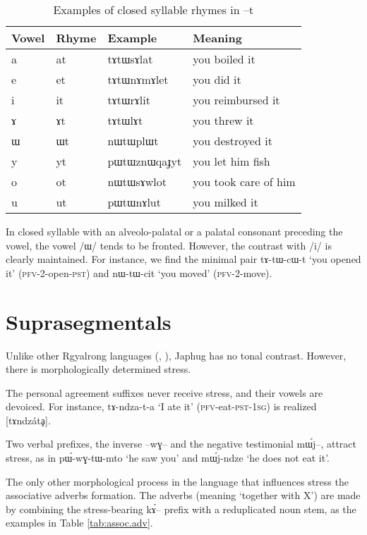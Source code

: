 \documentclass[oldfontcommands,oneside,a4paper,11pt]{article}
\newcommand{\ipa}[1]{{\phon #1}} %
\begin{document}
\begin{table}
 \caption{Examples of closed syllable rhymes in \ipa{--t}} \label{tab:t.rhymes}  \centering
\begin{tabular}{llll}
\toprule
Vowel & Rhyme & Example & Meaning\\
\midrule
\ipa{a} &	   	\ipa{at} &\ipa{tɤtɯsɤlat} &you boiled it\\
\ipa{e} &	  	\ipa{et} &\ipa{tɤtɯnɤmɤlet} & you did it\\
\ipa{i} &	   	\ipa{it} &\ipa{tɤtɯrɤlit} & you reimbursed it\\
\ipa{ɤ} &	   	\ipa{ɤt} &\ipa{tɤtɯlɤt} & you threw it\\
\ipa{ɯ} &	   	\ipa{ɯt} &\ipa{nɯtɯplɯt} & you destroyed it \\
\ipa{y} &	 \ipa{yt} &\ipa{pɯtɯznɯqaɟyt} & you let him fish\\
\ipa{o} & 	\ipa{ot} &\ipa{nɯtɯsɤwlot} & you took care of him\\
\ipa{u} & 	\ipa{ut} & \ipa{pɯtɯnɤlut} & you milked it\\
\bottomrule
\end{tabular}
\end{table}

In closed syllable with an alveolo-palatal or a palatal consonant preceding the vowel, the vowel /\ipa{ɯ}/ tends to be fronted. However, the contrast with /\ipa{i}/ is clearly maintained. For instance, we find the minimal pair \ipa{tɤ-tɯ-cɯ-t} `you opened it' (\textsc{pfv}-2-open-\textsc{pst}) and \ipa{nɯ-tɯ-cit} `you moved' (\textsc{pfv}-2-move).
    
     \section{Suprasegmentals}
Unlike other Rgyalrong languages (\citealt{jackson05yingao}, \citealt{linyj12tone}), Japhug has no tonal contrast. However, there is morphologically determined stress.

The personal agreement suffixes never receive stress, and their vowels are devoiced. For instance, \ipa{tɤ-ndza-t-a} `I ate it' (\textsc{pfv}-eat-\textsc{pst-1sg}) is realized [tɤndzátḁ].

Two verbal prefixes, the inverse \ipa{--wɣ--} and the negative testimonial \ipa{mɯ́j--}, attract stress, as in \ipa{pɯ́-wɣ-tɯ-mto} `he saw you' and \ipa{mɯ́j-ndze} `he does not eat it'.
         
         
The only other morphological process in the language that influences stress the  associative adverbs formation. The adverbs (meaning `together with X') are made by combining the stress-bearing \ipa{kɤ́--}  prefix with a reduplicated noun stem, as the examples in Table \ref{tab:assoc.adv}.
\end{document}

